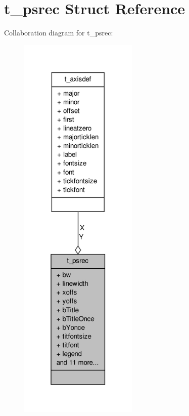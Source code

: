 \hypertarget{structt__psrec}{\section{t\-\_\-psrec \-Struct \-Reference}
\label{structt__psrec}
}


\-Collaboration diagram for t\-\_\-psrec\-:
\nopagebreak
\begin{figure}[H]
\begin{center}
\leavevmode
\includegraphics[width=160pt]{structt__psrec__coll__graph}
\end{center}
\end{figure}
